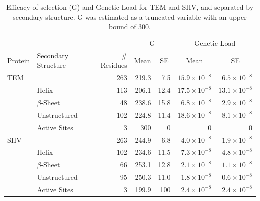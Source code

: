 \documentclass[12pt]{article}
\begin{document}
\begin{table}
  \centering
  \begin{tabular}{llrrrrr}
    & & & \multicolumn{2}{c}{G} & \multicolumn{2}{c}{Genetic Load} \\ 
    Protein & Secondary Structure & \# Residues	& \multicolumn{1}{c}{Mean} & \multicolumn{1}{c}{SE} & \multicolumn{1}{c}{Mean} & \multicolumn{1}{c}{SE} \\ \hline 
    TEM	&		& 263 & 219.3 & 7.5  & $15.9\times10^{-8}$ & $6.5\times10^{-8}$ \\
    &Helix 		& 113 & 206.1 & 12.4 & $17.5\times10^{-8}$ & $13.1\times10^{-8}$ \\
    &$\beta$-Sheet 	&  48 & 238.6 & 15.8 & $ 6.8\times10^{-8}$ & $2.9\times10^{-8}$ \\
    &Unstructured 	& 102 & 224.8 & 11.4 & $18.6\times10^{-8}$ & $8.1\times10^{-8}$ \\
    &Active Sites 	&   3 & 300   & 0    & 0      & 0      \\ \hline
    
    SHV&		& 263 & 244.9 & 6.8  & $4.0\times10^{-8}$ & $1.9\times10^{-8}$ \\
    &Helix		& 102 & 234.6 & 11.5 & $7.3\times10^{-8}$ & $4.8\times10^{-8}$ \\
    &$\beta$-Sheet 	&  66 & 253.1 & 12.8 & $2.1\times10^{-8}$ & $1.1\times10^{-8}$ \\
    &Unstructured	&  95 & 250.3 & 11.0 & $1.8\times10^{-8}$ & $0.6\times10^{-8}$  \\
    &Active Sites	&   3 & 199.9 & 100  & $2.4\times10^{-8}$ & $2.4\times10^{-8}$ \\

  \end{tabular}
  \caption{Efficacy of selection (G) and Genetic Load for TEM and SHV, and separated by secondary structure. G was estimated as a truncated variable with an upper bound of 300.}
  \label{tab:selection}
\end{table}
\end{document}

